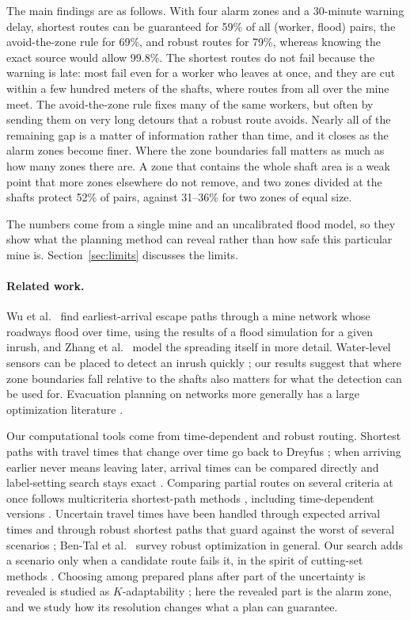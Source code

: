 \documentclass[11pt,a4paper]{article}
\begin{document}
The main findings are as follows. With four alarm zones and a 30-minute warning delay, shortest routes can be guaranteed for 59\% of all (worker, flood) pairs, the avoid-the-zone rule for 69\%, and robust routes for 79\%, whereas knowing the exact source would allow 99.8\%. The shortest routes do not fail because the warning is late: most fail even for a worker who leaves at once, and they are cut within a few hundred meters of the shafts, where routes from all over the mine meet. The avoid-the-zone rule fixes many of the same workers, but often by sending them on very long detours that a robust route avoids. Nearly all of the remaining gap is a matter of information rather than time, and it closes as the alarm zones become finer. Where the zone boundaries fall matters as much as how many zones there are. A zone that contains the whole shaft area is a weak point that more zones elsewhere do not remove, and two zones divided at the shafts protect 52\% of pairs, against 31--36\% for two zones of equal size.

The numbers come from a single mine and an uncalibrated flood model, so they show what the planning method can reveal rather than how safe this particular mine is. Section~\ref{sec:limits} discusses the limits.

\paragraph{Related work.}
Wu et al.\ \cite{wu2020} find earliest-arrival escape paths through a mine network whose roadways flood over time, using the results of a flood simulation for a given inrush, and Zhang et al.\ \cite{zhang2022} model the spreading itself in more detail. Water-level sensors can be placed to detect an inrush quickly \cite{wu2021}; our results suggest that where zone boundaries fall relative to the shafts also matters for what the detection can be used for. Evacuation planning on networks more generally has a large optimization literature \cite{bayram2016}.

Our computational tools come from time-dependent and robust routing. Shortest paths with travel times that change over time go back to Dreyfus \cite{dreyfus1969}; when arriving earlier never means leaving later, arrival times can be compared directly and label-setting search stays exact \cite{kaufman,orda}. Comparing partial routes on several criteria at once follows multicriteria shortest-path methods \cite{martins1984}, including time-dependent versions \cite{hamacher2006}. Uncertain travel times have been handled through expected arrival times \cite{millerhooks2000} and through robust shortest paths that guard against the worst of several scenarios \cite{yu1998,bertsimas2003}; Ben-Tal et al.\ \cite{bental2009} survey robust optimization in general. Our search adds a scenario only when a candidate route fails it, in the spirit of cutting-set methods \cite{mutapcic2009}. Choosing among prepared plans after part of the uncertainty is revealed is studied as $K$-adaptability \cite{hanasusanto}; here the revealed part is the alarm zone, and we study how its resolution changes what a plan can guarantee.
\end{document}
